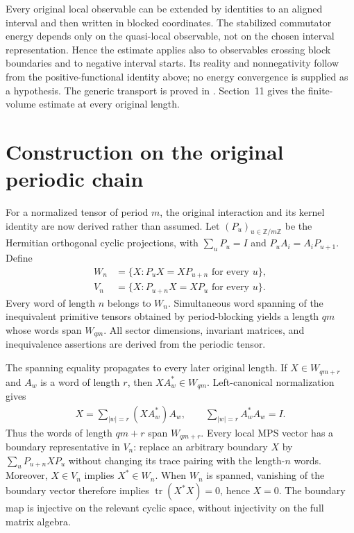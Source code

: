 \documentclass{article}
\begin{document}
Every original local observable can be extended by identities to an aligned
interval and then written in blocked coordinates. The stabilized commutator
energy depends only on the quasi-local observable, not on the chosen
interval representation. Hence the estimate applies also to observables
crossing block boundaries and to negative interval starts. Its reality and
nonnegativity follow from the positive-functional identity above; no energy
convergence is supplied as a hypothesis. The generic transport is proved in
.
Section~11 gives the finite-volume estimate at every original length.


\clearpage
\section{Construction on the original periodic chain}
For a normalized tensor of period $m$, the original interaction and its kernel
identity are now derived rather than assumed. Let $(P_u)_{u\in\mathbb Z/m\mathbb Z}$
be the Hermitian orthogonal cyclic projections, with
$\sum_uP_u=I$ and $P_uA_i=A_iP_{u+1}$. Define
\begin{align}
 W_n&=\{X:P_uX=XP_{u+n}\text{ for every }u\},\\
 V_n&=\{X:P_{u+n}X=XP_u\text{ for every }u\}.
\end{align}
Every word of length $n$ belongs to $W_n$. Simultaneous word spanning of the
inequivalent primitive tensors obtained by period-blocking yields a length
$q m$ whose words span $W_{qm}$. All sector dimensions, invariant matrices,
and inequivalence assertions are derived from the periodic tensor.

The spanning equality propagates to every later original length. If
$X\in W_{qm+r}$ and $A_w$ is a word of length $r$, then
$XA_w^*\in W_{qm}$. Left-canonical normalization gives
\begin{align}
 X=\sum_{|w|=r}(XA_w^*)A_w,
 \qquad \sum_{|w|=r}A_w^*A_w=I.
\end{align}
Thus the words of length $qm+r$ span $W_{qm+r}$.
Every local MPS vector has a boundary representative in $V_n$: replace an
arbitrary boundary $X$ by $\sum_uP_{u+n}XP_u$ without changing its trace
pairing with the length-$n$ words. Moreover, $X\in V_n$ implies
$X^*\in W_n$. When $W_n$ is spanned, vanishing of the boundary vector therefore
implies $\operatorname{tr}(X^*X)=0$, hence $X=0$. The boundary map is
injective on the relevant cyclic space, without injectivity on the full
matrix algebra.
\end{document}
